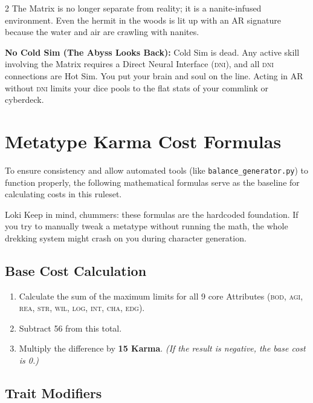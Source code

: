 \documentclass[10pt, letterpaper]{article}
\begin{document}
\begin{multicols}{2}
The Matrix is no longer separate from reality; it is a nanite-infused
environment. Even the hermit in the woods is lit up with an AR signature
because the water and air are crawling with nanites.

\textbf{No Cold Sim (The Abyss Looks Back):} Cold Sim is dead. Any
active skill involving the Matrix requires a Direct Neural Interface
(\textsc{dni}), and all \textsc{dni} connections are Hot Sim. You put your brain and
soul on the line. Acting in AR without \textsc{dni} limits your dice pools to
the flat stats of your commlink or cyberdeck.

\vfill\null
\columnbreak

\section*{Metatype Karma Cost Formulas}

To ensure consistency and allow automated tools (like \texttt{balance\_generator.py}) to function properly, the following mathematical formulas serve as the baseline for calculating costs in this ruleset.

\begin{jackpoint}{Loki}
Keep in mind, chummers: these formulas are the hardcoded foundation. If you try to manually tweak a metatype without running the math, the whole drekking system might crash on you during character generation.
\end{jackpoint}

\subsection*{Base Cost Calculation}
\begin{enumerate}
    \item Calculate the sum of the maximum limits for all 9 core Attributes (\textsc{bod}, \textsc{agi}, \textsc{rea}, \textsc{str}, \textsc{wil}, \textsc{log}, \textsc{int}, \textsc{cha}, \textsc{edg}).
    \item Subtract 56 from this total.
    \item Multiply the difference by \textbf{15 Karma}. \textit{(If the result is negative, the base cost is 0.)}
\end{enumerate}

\subsection*{Trait Modifiers}


\end{multicols}
\end{document}
